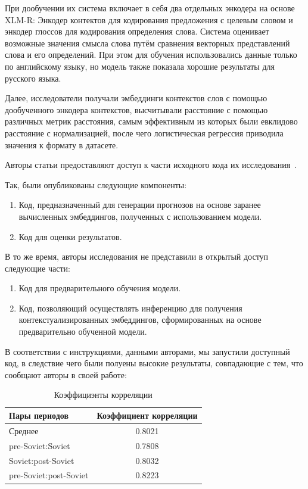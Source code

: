 \documentclass[LI,VKR]{HSEUniversity}
\begin{document}
При дообучении их система включает в себя два отдельных энкодера на основе XLM-R:
Энкодер контектов для кодирования предложения с целевым словом и
энкодер глоссов для кодирования определения слова.
Система оценивает возможные значения смысла слова путём сравнения векторных представлений слова
и его определений.
При этом для обучения использовались данные только по английскому языку,
но модель также показала хорошие результаты для русского языка.

Далее, исследователи получали эмбеддинги контекстов слов с помощью
дообученного энкодера контекстов, высчитывали расстояние с помощью различных метрик расстояния,
самым эффективным из которых были евклидово расстояние с нормализацией, после чего
логистическая регрессия приводила значения к формату в датасете.

Авторы статьи предоставляют доступ к части исходного кода их исследования~\cite{GlossReaderGitHub}.

Так, были опубликованы следующие компоненты:
\begin{enumerate}
    \item Код, предназначенный для генерации прогнозов на основе заранее вычисленных эмбеддингов,
полученных с использованием модели.
    \item Код для оценки результатов.
\end{enumerate}

В то же время, авторы исследования не представили в открытый доступ следующие части:
\begin{enumerate}
    \item Код для предварительного обучения модели.
    \item Код, позволяющий осуществлять инференцию для получения контекстуализированных
    эмбеддингов, сформированных на основе предварительно обученной модели.
\end{enumerate}

В соответствии с инструкциями, данными авторами, мы запустили доступный код,
в следствие чего были полуены высокие результаты, совпадающие с тем, что сообщают
авторы в своей работе:

\begin{table}[htbp]
\centering
\caption{Коэффициэнты корреляции}
\begin{tabular}{lc}
\hline
Пары периодов                  & Коэффициент корреляции \\
\hline
Среднее            & 0.8021                  \\
pre-Soviet:Soviet           & 0.7808                  \\
Soviet:post-Soviet          & 0.8032                  \\
pre-Soviet:post-Soviet      & 0.8223                  \\
\hline
\end{tabular}
\end{table}
\end{document}
